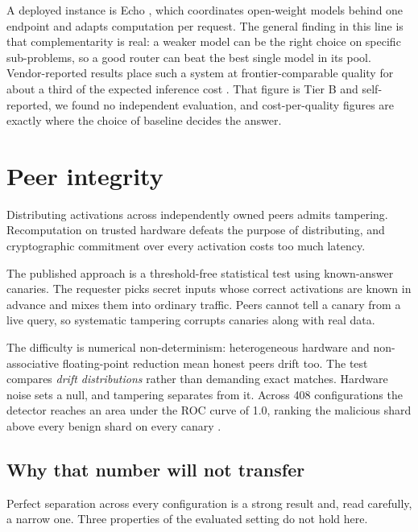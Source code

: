 \documentclass[11pt]{article}
\begin{document}
A deployed instance is Echo \cite{tracer2026echo}, which coordinates open-weight models behind one endpoint and adapts computation per request. The general finding in this line \cite{brick2026,generalizedrouting2025} is that complementarity is real: a weaker model can be the right choice on specific sub-problems, so a good router can beat the best single model in its pool. Vendor-reported results place such a system at frontier-comparable quality for about a third of the expected inference cost \cite{tracer2026echo}. That figure is Tier B and self-reported, we found no independent evaluation, and cost-per-quality figures are exactly where the choice of baseline decides the answer.

\section{Peer integrity}
\label{sec:integrity}

Distributing activations across independently owned peers admits tampering. Recomputation on trusted hardware defeats the purpose of distributing, and cryptographic commitment over every activation costs too much latency.

The published approach \cite{cihangiroglu2026integrity} is a threshold-free statistical test using known-answer canaries. The requester picks secret inputs whose correct activations are known in advance and mixes them into ordinary traffic. Peers cannot tell a canary from a live query, so systematic tampering corrupts canaries along with real data.

The difficulty is numerical non-determinism: heterogeneous hardware and non-associative floating-point reduction mean honest peers drift too. The test compares \emph{drift distributions} rather than demanding exact matches. Hardware noise sets a null, and tampering separates from it. Across 408 configurations the detector reaches an area under the ROC curve of 1.0, ranking the malicious shard above every benign shard on every canary \cite{cihangiroglu2026integrity}.

\subsection{Why that number will not transfer}
\label{sec:canarylimit}

Perfect separation across every configuration is a strong result and, read carefully, a narrow one. Three properties of the evaluated setting do not hold here.
\end{document}
